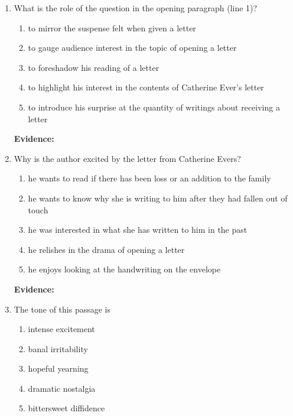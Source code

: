 \begin{enumerate}

\item What is the role of the question in the opening paragraph (line 1)?

\begin{enumerate}[label=(\Alph*)]
\item to mirror the suspense felt when given a letter
\item to gauge audience interest in the topic of opening a letter
\item to foreshadow his reading of a letter
\item to highlight his interest in the contents of Catherine Ever's letter
\item to introduce his surprise at the quantity of writings about receiving a letter
\end{enumerate} 

\bigskip
\textbf{Evidence:} \hrulefill

\bigskip
\item Why is the author excited by the letter from Catherine Evers?

\begin{enumerate}[label=(\Alph*)]
\item he wants to read if there has been loss or an addition to the family
\item he wants to know why she is writing to him after they had fallen out of touch
\item he was interested in what she has written to him in the past
\item he relishes in the drama of opening a letter
\item he enjoys looking at the handwriting on the envelope
\end{enumerate} 

\bigskip
\textbf{Evidence:} \hrulefill

\bigskip
\item The tone of this passage is

\begin{enumerate}[label=(\Alph*)]
\item intense excitement
\item banal irritability
\item hopeful yearning
\item dramatic nostalgia 
\item bittersweet diffidence 
\end{enumerate}


\end{enumerate}
